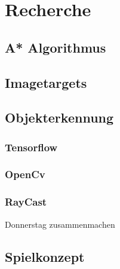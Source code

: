\chapter{Recherche}
\label{sec:recherche}


\section{A* Algorithmus}
\section{Imagetargets}
\section{Objekterkennung}
\subsection{Tensorflow}
\subsection{OpenCv}
\subsection{RayCast}

Donnerstag zusammenmachen
\section{Spielkonzept}
